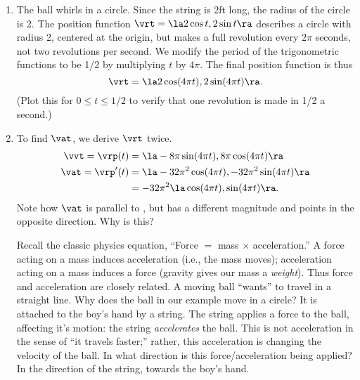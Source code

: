 {\begin{enumerate}
	\item The ball whirls in a  circle. Since the string is 2ft long, the radius of the circle is 2. The position function $\vrt = \la 2\cos t, 2\sin t\ra$ describes a circle with radius 2, centered at the origin, but makes a full revolution every $2\pi$ seconds, not two revolutions per second. We modify the period of the trigonometric functions to be 1/2 by multiplying $t$ by $4\pi$. The final position function is thus $$\vrt = \la 2\cos (4\pi t), 2\sin (4\pi t)\ra.$$
	(Plot this for $0\leq t\leq 1/2$ to verify that one revolution is made in 1/2 a second.)
	
	\item		To find $\vat$, we derive $\vrt$ twice.
	\begin{align*}
	\vvt = \vrp(t) &= \la -8\pi \sin (4\pi t), 8\pi \cos (4\pi t)\ra\\
	\vat =\vrp'(t) &= \la -32\pi^2 \cos (4\pi t), -32\pi^2 \sin (4\pi t) \ra \\
				&= -32\pi^2\la \cos (4\pi t), \sin (4\pi t)\ra.
	\end{align*}
	Note how $\vat$ is parallel to \vrt, but has a different magnitude and points in the opposite direction. Why is this?
	
	Recall the classic physics equation, ``Force $=$ mass $\times$ acceleration.'' A force acting on a mass induces acceleration (i.e., the mass moves); acceleration acting on a mass induces a force (gravity gives our mass a \emph{weight}). Thus force and acceleration are closely related. A moving ball ``wants'' to travel in a straight line. Why does the ball in our example move in a circle? It is attached to the boy's hand by a string. The string applies a force to the ball, affecting it's motion: the string \emph{accelerates} the ball. This is not acceleration in the sense of ``it travels faster;'' rather, this acceleration is changing the velocity of the ball. In what direction is this force/acceleration being applied? In the direction of the string, towards the boy's hand.
	

\end{enumerate}}
